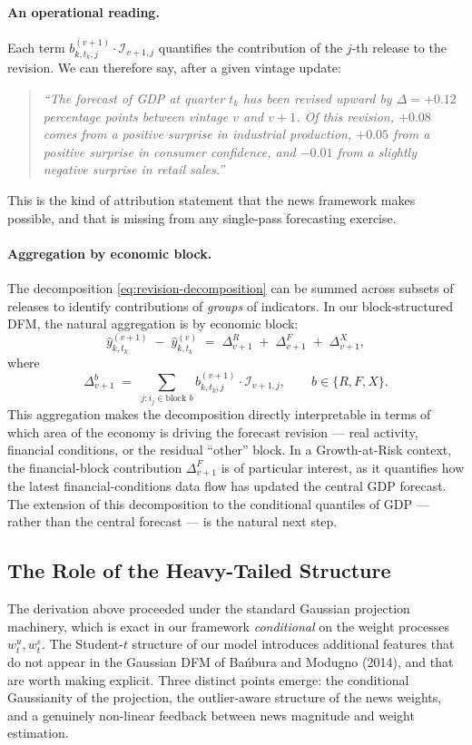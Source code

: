 \documentclass[11pt, a4paper, oneside]{article}
\begin{document}
\paragraph{An operational reading.}
Each term $b_{k, t_k, j}^{(v+1)} \cdot \mathcal{I}_{v+1, j}$
quantifies the contribution of the $j$-th release to the revision.
We can therefore say, after a given vintage update:
\begin{quote}
\emph{``The forecast of GDP at quarter $t_k$ has been revised upward
by $\Delta = +0.12$ percentage points between vintage $v$ and $v+1$.
Of this revision, $+0.08$ comes from a positive surprise in
industrial production, $+0.05$ from a positive surprise in
consumer confidence, and $-0.01$ from a slightly negative surprise
in retail sales.''}
\end{quote}
This is the kind of attribution statement that the news framework
makes possible, and that is missing from any single-pass forecasting
exercise.

\paragraph{Aggregation by economic block.}
The decomposition \eqref{eq:revision-decomposition} can be summed
across subsets of releases to identify contributions of \emph{groups}
of indicators. In our block-structured DFM, the natural aggregation
is by economic block:
\[
\hat{y}_{k, t_k}^{(v+1)} \;-\; \hat{y}_{k, t_k}^{(v)} \;=\;
\Delta^{R}_{v+1} \;+\; \Delta^{F}_{v+1} \;+\; \Delta^{X}_{v+1},
\]
where
\[
\Delta^{b}_{v+1} \;=\; \sum_{j : i_j \in \text{block } b} b_{k, t_k, j}^{(v+1)} \cdot \mathcal{I}_{v+1, j},
\qquad b \in \{R, F, X\}.
\]
This aggregation makes the decomposition directly interpretable in
terms of which area of the economy is driving the forecast revision
— real activity, financial conditions, or the residual ``other''
block. In a Growth-at-Risk context, the financial-block contribution
$\Delta^{F}_{v+1}$ is of particular interest, as it quantifies how
the latest financial-conditions data flow has updated the central GDP forecast. The extension of this decomposition
to the conditional quantiles of GDP — rather than the central
forecast — is the natural next step.


\subsection{The Role of the Heavy-Tailed Structure}
\label{subsec:news-student-t}

The derivation above proceeded under the standard Gaussian projection
machinery, which is exact in our framework \emph{conditional} on the
weight processes $w^u_t, w^\varepsilon_t$. The Student-$t$ structure
of our model introduces additional features that do not appear in
the Gaussian DFM of Ba\'nbura and Modugno (2014), and that are worth
making explicit. Three distinct points emerge: the conditional
Gaussianity of the projection, the outlier-aware structure of the
news weights, and a genuinely non-linear feedback between news
magnitude and weight estimation.
\end{document}

